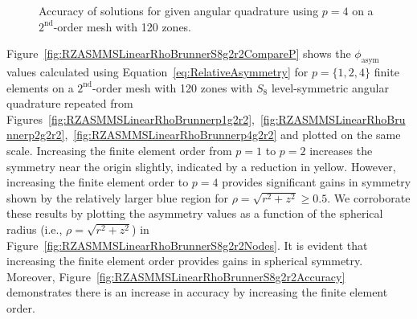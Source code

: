 \documentclass[12pt,letterpaper]{article}
\begin{document}
\begin{figure}[!htb]
\centering
{}
\caption{Accuracy of solutions for given angular quadrature using $p=4$ on a $2^\text{nd}$-order mesh with 120 zones.}
\label{fig:RZASMMSLinearRhoBrunnerp4g2r2Accuracy}
\end{figure}

\FloatBarrier

Figure~\ref{fig:RZASMMSLinearRhoBrunnerS8g2r2CompareP} shows the $\phi_\text{asym}$ values calculated using Equation~\ref{eq:RelativeAsymmetry} for $p=\{1,2,4\}$ finite elements on a $2^\text{nd}$-order mesh with 120 zones with $S_8$ level-symmetric angular quadrature repeated from Figures~\ref{fig:RZASMMSLinearRhoBrunnerp1g2r2},~\ref{fig:RZASMMSLinearRhoBrunnerp2g2r2},~\ref{fig:RZASMMSLinearRhoBrunnerp4g2r2} and plotted on the same scale. Increasing the finite element order from $p=1$ to $p=2$ increases the symmetry near the origin slightly, indicated by a reduction in yellow. However, increasing the finite element order to $p=4$ provides significant gains in symmetry shown by the relatively larger blue region for $\rho=\sqrt{r^2+z^2} \geq 0.5$. We corroborate these results by plotting the asymmetry values as a function of the spherical radius (i.e., $\rho=\sqrt{r^2+z^2}$) in Figure~\ref{fig:RZASMMSLinearRhoBrunnerS8g2r2Nodes}. It is evident that increasing the finite element order provides gains in spherical symmetry. Moreover, Figure~\ref{fig:RZASMMSLinearRhoBrunnerS8g2r2Accuracy} demonstrates there is an increase in accuracy by increasing the finite element order.
\end{document}
